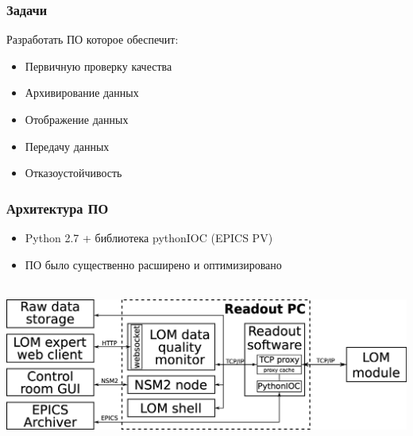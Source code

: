 \documentclass{beamer}
\begin{document}
\begin{frame}
\frametitle{Задачи}
Разработать ПО которое обеспечит:
  \begin{itemize}
    \item Первичную проверку качества
    \item Архивирование данных
    \item Отображение данных
    \item Передачу данных
    \item Отказоустойчивость
  \end{itemize}
\end{frame}

\begin{frame}
\frametitle{Архитектура ПО}
    \begin{itemize}
        \item Python 2.7 + библиотека pythonIOC (EPICS PV)
        \item ПО было существенно расширено и оптимизировано 
        \\~\\
    \end{itemize}
\includegraphics[width=\textwidth]{LOM_software.png}
\end{frame}
\end{document}
